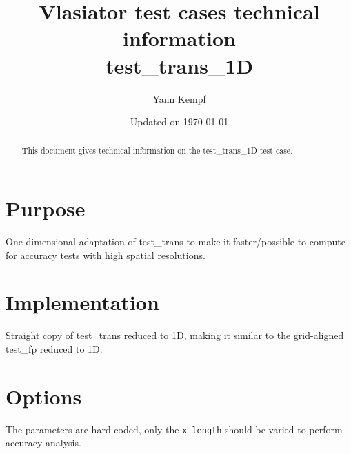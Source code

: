\documentclass[a4paper,10pt]{scrartcl}
\title{
\Huge{Vlasiator test cases technical information} \\
\LARGE{test\_trans\_1D}
}
\author{Yann Kempf}
\date{Updated on \today}
\begin{document}
\maketitle

\begin{abstract}
   This document gives technical information on the test\_trans\_1D test case.
\end{abstract}

\section{Purpose}
One-dimensional adaptation of test\_trans to make it faster/possible to compute for accuracy tests with high spatial resolutions.


\section{Implementation}
Straight copy of test\_trans reduced to 1D, making it similar to the grid-aligned test\_fp reduced to 1D.

\section{Options}
The parameters are hard-coded, only the \verb=x_length= should be varied to perform accuracy analysis.
\end{document}
